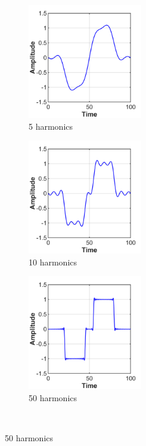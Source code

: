 \begin{figure}[p]
    \centering
    \begin{subfigure}[t]{0.33\textwidth}
        \centering
        \includegraphics[width=5cm]{Simulations/TimeDep/ramped_biphasic_N5}
        \caption{5 harmonics}
        \label{fig:biphasic_conv_ramp_5}
    \end{subfigure}%
	\hfill%
	\begin{subfigure}[t]{0.33\textwidth}
        \centering
        \includegraphics[width=5cm]{Simulations/TimeDep/ramped_biphasic_N10}
        \caption{10 harmonics}
        \label{fig:biphasic_conv_ramp_10}
    \end{subfigure}%
    \hfill%
    \begin{subfigure}[t]{0.33\textwidth}
        \centering
        \includegraphics[width=5cm]{Simulations/TimeDep/ramped_biphasic_N50}
        \caption{50 harmonics}
        \label{fig:biphasic_conv_ramp_50}
    \end{subfigure}\\%
    \vspace{1em}%

\end{figure}
